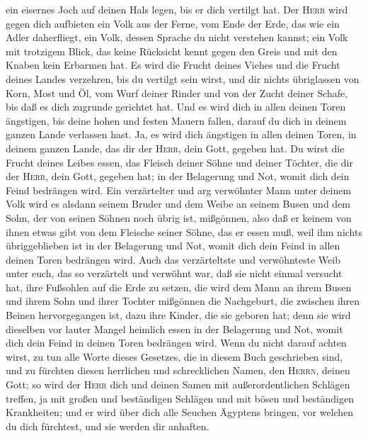 ein eisernes Joch auf deinen Hals legen, bis er dich vertilgt hat.
 Der \textsc{Herr} wird gegen dich aufbieten ein Volk aus
der Ferne, vom Ende der Erde, das wie ein Adler daherfliegt, ein Volk,
dessen Sprache du nicht verstehen kannst;  ein Volk mit
trotzigem Blick, das keine Rücksicht kennt gegen den Greis und mit den
Knaben kein Erbarmen hat.  Es wird die Frucht deines
Viehes und die Frucht deines Landes verzehren, bis du vertilgt sein
wirst, und dir nichts übriglassen von Korn, Most und Öl, vom Wurf deiner
Rinder und von der Zucht deiner Schafe, bis daß es dich zugrunde
gerichtet hat. Und es wird dich in allen deinen Toren ängstigen, bis
deine hohen und festen Mauern fallen,  darauf du dich in
deinem ganzen Lande verlassen hast. Ja, es wird dich ängstigen in allen
deinen Toren, in deinem ganzen Lande, das dir der \textsc{Herr}, dein
Gott, gegeben hat.  Du wirst die Frucht deines Leibes
essen, das Fleisch deiner Söhne und deiner Töchter, die dir der
\textsc{Herr}, dein Gott, gegeben hat; in der Belagerung und Not, womit
dich dein Feind bedrängen wird.  Ein verzärtelter und arg
verwöhnter Mann unter deinem Volk wird es alsdann seinem Bruder und dem
Weibe an seinem Busen und dem Sohn, der von seinen Söhnen noch übrig
ist, mißgönnen,  also daß er keinem von ihnen etwas gibt
von dem Fleische seiner Söhne, das er essen muß, weil ihm nichts
übriggeblieben ist in der Belagerung und Not, womit dich dein Feind in
allen deinen Toren bedrängen wird.  Auch das
verzärteltste und verwöhnteste Weib unter euch, das so verzärtelt und
verwöhnt war, daß sie nicht einmal versucht hat, ihre Fußsohlen auf die
Erde zu setzen, die wird dem Mann an ihrem Busen und ihrem Sohn und
ihrer Tochter  mißgönnen die Nachgeburt, die zwischen
ihren Beinen hervorgegangen ist, dazu ihre Kinder, die sie geboren hat;
denn sie wird dieselben vor lauter Mangel heimlich essen in der
Belagerung und Not, womit dich dein Feind in deinen Toren bedrängen
wird.  Wenn du nicht darauf achten wirst, zu tun alle
Worte dieses Gesetzes, die in diesem Buch geschrieben sind, und zu
fürchten diesen herrlichen und schrecklichen Namen, den \textsc{Herrn},
deinen Gott;  so wird der \textsc{Herr} dich und deinen
Samen mit außerordentlichen Schlägen treffen, ja mit großen und
beständigen Schlägen und mit bösen und beständigen Krankheiten;
 und er wird über dich alle Seuchen Ägyptens bringen, vor
welchen du dich fürchtest, und sie werden dir anhaften. 

